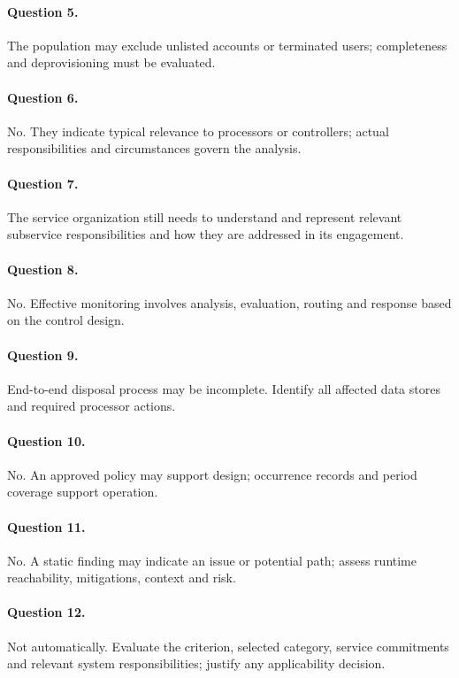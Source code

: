\documentclass[10pt,oneside]{report}
\begin{document}
\paragraph{Question 5.} The population may exclude unlisted accounts or terminated users; completeness and deprovisioning must be evaluated.

\paragraph{Question 6.} No. They indicate typical relevance to processors or controllers; actual responsibilities and circumstances govern the analysis.

\paragraph{Question 7.} The service organization still needs to understand and represent relevant subservice responsibilities and how they are addressed in its engagement.

\paragraph{Question 8.} No. Effective monitoring involves analysis, evaluation, routing and response based on the control design.

\paragraph{Question 9.} End-to-end disposal process may be incomplete. Identify all affected data stores and required processor actions.

\paragraph{Question 10.} No. An approved policy may support design; occurrence records and period coverage support operation.

\paragraph{Question 11.} No. A static finding may indicate an issue or potential path; assess runtime reachability, mitigations, context and risk.

\paragraph{Question 12.} Not automatically. Evaluate the criterion, selected category, service commitments and relevant system responsibilities; justify any applicability decision.
\end{document}
